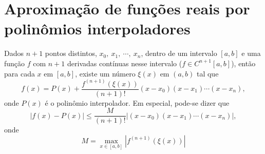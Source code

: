 \section{Aproximação de funções reais por polinômios interpoladores}

\begin{teo}\label{teo_interp}
Dados $n+1$ pontos distintos, $x_0,\ x_1,\ \cdots,\ x_n$, dentro de um intervalo $[a,b]$ e uma função $f$ com $n+1$ derivadas contínuas nesse intervalo ($f\in C^{n+1}[a,b]$), então para cada $x$ em $[a,b]$, existe um número $\xi(x)$ em $(a,b)$ tal que
\begin{equation}
f(x)=P(x)+\frac{f^{(n+1)}(\xi(x))}{(n+1)!}(x-x_0)(x-x_1)\cdots(x-x_n),
\end{equation}
onde $P(x)$ é o polinômio interpolador. Em especial, pode-se dizer que
\begin{equation}
|f(x)-P(x)|\leq \frac{M}{(n+1)!}\left|(x-x_0)(x-x_1)\cdots(x-x_n)\right|,
\end{equation}
onde
\begin{equation}
M=\max_{x\in[a,b]}|f^{(n+1)}(\xi(x))|
\end{equation}
\end{teo}


